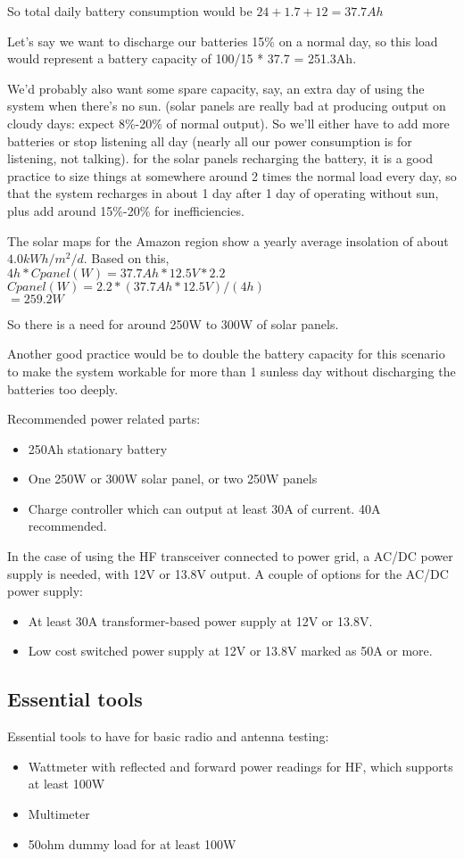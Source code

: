 \documentclass[11pt,a4paper]{article}
\begin{document}
So total daily battery consumption would be $24+1.7+12 = 37.7Ah$

Let's say we want to discharge our batteries 15\% on a normal day, so
this load would represent a battery capacity of 100/15 * 37.7 = 251.3Ah.

We'd probably also want some spare capacity, say, an extra day of using the 
system when there's no sun. (solar panels are really bad at producing output
on cloudy days: expect 8\%-20\% of normal output). So we'll either have to
add more batteries or stop listening all day (nearly all our power
consumption is for listening, not talking). for the solar panels recharging
the battery, it is a good practice to size things at somewhere around 2
times the normal load every day, so that the system recharges in about 1 day
after 1 day of operating without sun, plus add around 15\%-20\% for
inefficiencies.

The solar maps for the Amazon region show a yearly average insolation
of about $4.0 kWh/m^2/d$. Based on this,\\
$4h * Cpanel(W) = 37.7Ah*12.5V*2.2$\\
$Cpanel(W) = 2.2*(37.7Ah*12.5V)/(4h)$\\
$= 259.2W$

So there is a need for around 250W to 300W of solar panels.

Another good practice would be to double the battery capacity for this
scenario to make the system workable for more than 1 sunless day without
discharging the batteries too deeply.

Recommended power related parts:
\begin{itemize}
\item 250Ah stationary battery
\item One 250W or 300W solar panel, or two 250W panels
\item Charge controller which can output at least 30A of current. 40A
  recommended.
\end{itemize}

In the case of using the HF transceiver connected to power grid, a AC/DC
power supply is needed, with 12V or 13.8V output. A couple of options for
the AC/DC power supply:


\begin{itemize}
\item At least 30A transformer-based power supply at 12V or 13.8V.
\item Low cost switched power supply at 12V or 13.8V marked as 50A or more.
\end{itemize}

\subsection{Essential tools}

Essential tools to have for basic radio and antenna testing:
\begin{itemize}
\item Wattmeter with reflected and forward power readings for HF, which
  supports at least 100W
\item Multimeter
\item 50ohm dummy load for at least 100W
\end{itemize}
\end{document}
